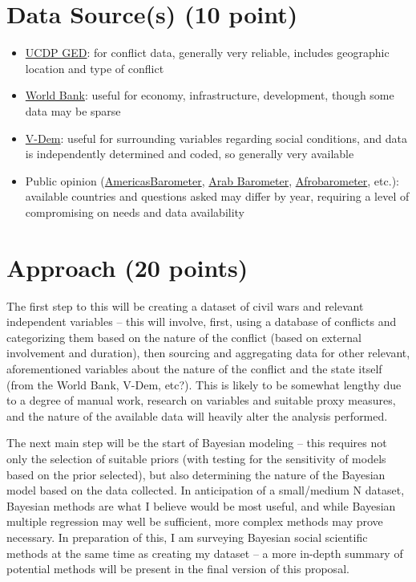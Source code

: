 \documentclass[11pt]{article}
\begin{document}
\section{Data Source(s) (10 point)}
\begin{itemize}
    \item \href{https://ucdp.uu.se/downloads/}{UCDP GED}: for conflict data, generally very reliable, includes geographic location and type of conflict
    \item \href{https://data.worldbank.org/}{World Bank}: useful for economy, infrastructure, development, though some data may be sparse
    \item \href{https://www.v-dem.net/data/}{V-Dem}: useful for surrounding variables regarding social conditions, and data is independently determined and coded, so generally very available
    \item Public opinion (\href{https://www.vanderbilt.edu/lapop/raw-data.php}{AmericasBarometer}, \href{https://www.arabbarometer.org/survey-data/data-downloads/}{Arab Barometer}, \href{https://www.afrobarometer.org/data/merged-data/}{Afrobarometer}, etc.): available countries and questions asked may differ by year, requiring a level of compromising on needs and data availability
\end{itemize}

\section{Approach (20 points)}

The first step to this will be creating a dataset of civil wars and relevant independent variables – this will involve, first, using a database of conflicts and categorizing them based on the nature of the conflict (based on external involvement and duration), then sourcing and aggregating data for other relevant, aforementioned variables about the nature of the conflict and the state itself (from the World Bank, V-Dem, etc?). This is likely to be somewhat lengthy due to a degree of manual work, research on variables and suitable proxy measures, and the nature of the available data will heavily alter the analysis performed.

The next main step will be the start of  Bayesian modeling – this requires not only the selection of suitable priors (with testing for the sensitivity of models based on the prior selected), but also determining the nature of the Bayesian model based on the data collected. In anticipation of a small/medium N dataset, Bayesian methods are what I believe would be most useful, and while Bayesian multiple regression may well be sufficient, more complex methods may prove necessary. In preparation of this, I am surveying Bayesian social scientific methods at the same time as creating my dataset – a more in-depth summary of potential methods will be present in the final version of this proposal.
\end{document}
